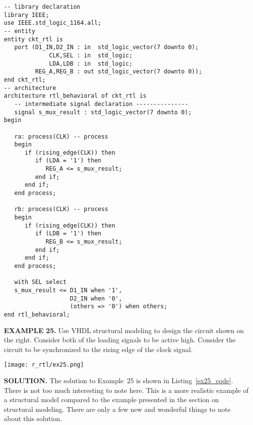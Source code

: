 \noindent
\begin{minipage}{0.99\linewidth}
\begin{lstlisting}[label=ex24_code, caption=Solution to Example~24.]
-- library declaration
library IEEE;
use IEEE.std_logic_1164.all;
-- entity
entity ckt_rtl is
   port (D1_IN,D2_IN : in  std_logic_vector(7 downto 0);
             CLK,SEL : in  std_logic;
             LDA,LDB : in  std_logic;
         REG_A,REG_B : out std_logic_vector(7 downto 0));
end ckt_rtl;
-- architecture
architecture rtl_behavioral of ckt_rtl is
   -- intermediate signal declaration ---------------
   signal s_mux_result : std_logic_vector(7 downto 0);
begin

   ra: process(CLK) -- process
   begin
      if (rising_edge(CLK)) then
         if (LDA = '1') then
            REG_A <= s_mux_result;
         end if;
      end if;
   end process;

   rb: process(CLK) -- process
   begin
      if (rising_edge(CLK)) then
         if (LDB = '1') then
            REG_B <= s_mux_result;
         end if;
      end if;
   end process;

   with SEL select
   s_mux_result <= D1_IN when '1',
                   D2_IN when '0',
                   (others => '0') when others;
end rtl_behavioral;
\end{lstlisting}
\end{minipage}

\begin{leftbar}
\begin{minipage}[t]{0.5\textwidth}
\vspace{10pt}
\noindent
\textbf{EXAMPLE 25.}
Use VHDL structural modeling to design the circuit shown on the right. Consider both of the loading signals to be active high. Consider the circuit to be synchronized to the rising edge of the clock signal.
\end{minipage}
\begin{minipage}[t]{0.5\textwidth}
\vspace{0pt}\raggedright
    \centering
	\texttt{[image: r\_rtl/ex25.png]}
\end{minipage}
\end{leftbar}
\noindent
\textbf{SOLUTION.} The solution to Example~25 is shown in Listing~\ref{ex25_code}. There is not too much interesting to note here. This is a more realistic example of a structural model compared to the example presented in the section on structural modeling. There are only a few new and wonderful things to note about this solution.

